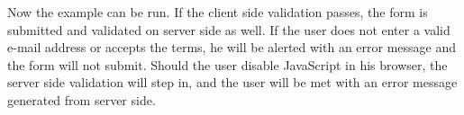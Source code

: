 

Now the example can be run. If the client side validation passes, the form is submitted and validated on server side as well.
If the user does not enter a valid e-mail address or accepts the terms, he will be alerted with an error message and the form will not submit. Should the user disable JavaScript in his browser, the server side validation will step in, and the user will be met with an error message generated from server side.

